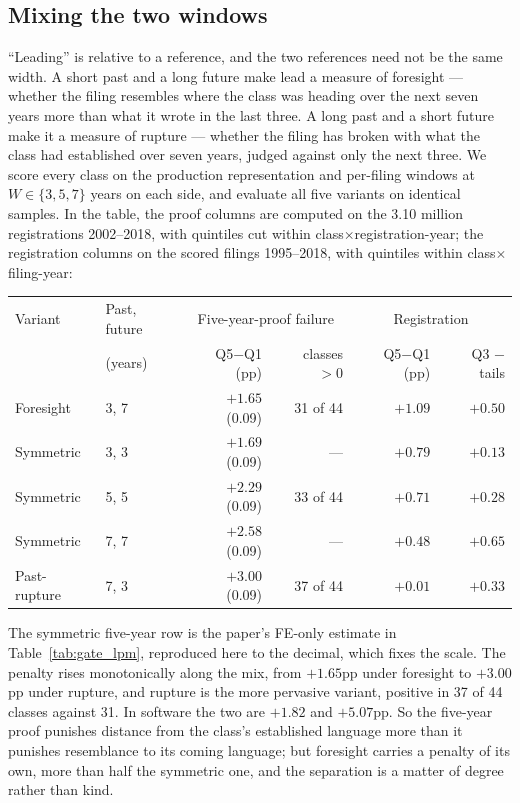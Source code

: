 \subsection{Mixing the two windows}\label{app:wmix}

``Leading'' is relative to a reference, and the two references need not be
the same width. A short past and a long future make lead a measure of
foresight --- whether the filing resembles where the class was heading over
the next seven years more than what it wrote in the last three. A long past
and a short future make it a measure of rupture --- whether the filing has
broken with what the class had established over seven years, judged against
only the next three. We score every class on the production
representation and per-filing windows at $W \in \{3, 5, 7\}$ years on
each side, and evaluate all five variants on identical samples. In the
table, the proof columns are computed on the 3.10 million registrations
2002--2018, with quintiles cut within class$\times$registration-year;
the registration columns on the scored filings 1995--2018, with
quintiles within class$\times$filing-year:

\begin{center}\small
\begin{tabular}{llrrrr}
\toprule
Variant & Past, future & \multicolumn{2}{c}{Five-year-proof failure} & \multicolumn{2}{c}{Registration} \\
 & (years) & Q5$-$Q1 (pp) & classes $>0$ & Q5$-$Q1 (pp) & Q3 $-$ tails \\
\midrule
Foresight     & 3, 7 & $+1.65$ (0.09) & 31 of 44 & $+1.09$ & $+0.50$ \\
Symmetric     & 3, 3 & $+1.69$ (0.09) & ---      & $+0.79$ & $+0.13$ \\
Symmetric     & 5, 5 & $+2.29$ (0.09) & 33 of 44 & $+0.71$ & $+0.28$ \\
Symmetric     & 7, 7 & $+2.58$ (0.09) & ---      & $+0.48$ & $+0.65$ \\
Past-rupture  & 7, 3 & $+3.00$ (0.09) & 37 of 44 & $+0.01$ & $+0.33$ \\
\bottomrule
\end{tabular}
\end{center}

\noindent The symmetric five-year row is the paper's FE-only estimate in
Table~\ref{tab:gate_lpm}, reproduced here to the decimal, which fixes the
scale. The penalty rises monotonically along the mix, from $+1.65$pp under
foresight to $+3.00$pp under rupture, and rupture is the more pervasive
variant, positive in 37 of 44 classes against 31. In software the two are
$+1.82$ and $+5.07$pp. So the five-year proof punishes distance from the
class's established language more than it punishes resemblance to its
coming language; but foresight carries a penalty of its own, more than half
the symmetric one, and the separation is a matter of degree rather than
kind.

